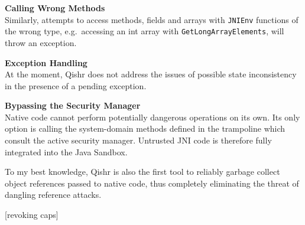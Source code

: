 \documentclass[a4paper,12pt,twoside,openright]{report}
\newcommand{\keyword}[1]{\textsf{#1}}
\begin{document}
\begin{description}
\item{\bf Calling Wrong Methods} \\
Similarly, attempts to access methods, fields and arrays with \texttt{JNIEnv} functions of the wrong type, e.g.\ accessing an \keyword{int} array with \texttt{Get\-Long\-Array\-Elements}, will throw an exception.

\item{\bf Exception Handling} \\
At the moment, Qishr does not address the issues of possible state inconsistency in the presence of a pending exception.

\item{\bf Bypassing the Security Manager} \\
Native code cannot perform potentially dangerous operations on its own. Its only option is calling the system-domain methods defined in the trampoline which consult the active security manager. Untrusted JNI code is therefore fully integrated into the Java Sandbox.
\end{description}

To my best knowledge, Qishr is also the first tool to reliably garbage collect object references passed to native code, thus completely eliminating the threat of dangling reference attacks.

[revoking caps]

\appendix
\singlespacing

 
 
\end{document}
